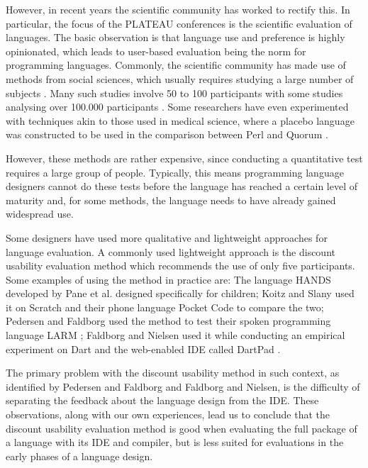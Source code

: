 \documentclass[preprint,10pt]{sigplanconf}
\begin{document}
However, in recent years the scientific community has worked to rectify this.
In particular, the focus of the PLATEAU conferences is the scientific evaluation of languages.
The basic observation is that language use and preference is highly opinionated, which leads to user-based evaluation being the norm for programming languages.
Commonly, the scientific community has made use of methods from social sciences, which usually requires studying a large number of subjects \cite{SocioPLT}\cite{AliceCS1}\cite{BlockOrNot}\cite{FromScratch}.
Many such studies involve 50 to 100 participants \cite{hanenberg2010experiment}\cite{EmpStudiesonStimuli} with some studies analysing over 100.000 participants \cite{brown2014investigating}.
Some researchers have even experimented with techniques akin to those used in medical science, where a placebo language was constructed to be used in the comparison between Perl and Quorum \cite{stefik2011empirical}.

However, these methods are rather expensive, since conducting a quantitative test requires a large group of people. Typically, this means programming language designers cannot do these tests before the language has reached a certain level of maturity and, for some methods, the language needs to have already gained widespread use. 

Some designers have used more qualitative and lightweight approaches for language evaluation. A commonly used lightweight approach is the discount usability evaluation method \cite{CooperativeEval} which recommends the use of only five participants. Some examples of using the method in practice are: The language HANDS developed by Pane et al. \cite{HANDS} designed specifically for children; Koitz and Slany \cite{PocketCode} used it on Scratch and their phone language Pocket Code to compare the two; Pedersen and Faldborg used the method to test their spoken programming language LARM \cite{LARM}; Faldborg and Nielsen used it while conducting an empirical experiment on Dart and the web-enabled IDE called DartPad \cite{DART}.

The primary problem with the discount usability method in such context, as identified by Pedersen and Faldborg and Faldborg and Nielsen, is the difficulty of separating the feedback about the language design from the IDE.
These observations, along with our own experiences, lead us to conclude that the discount usability evaluation method is good when evaluating the full package of a language with its IDE and compiler, but is less suited for evaluations in the early phases of a language design.
\end{document}
